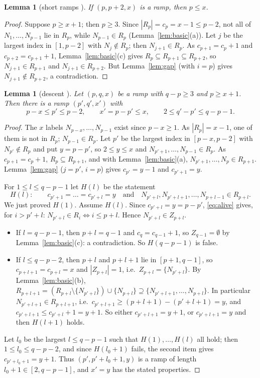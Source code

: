 \documentclass[11pt]{article}
\newtheorem{lemma}[theorem]{Lemma}
\theoremstyle{definition}
\newcommand{\R}{R}
\renewcommand{\le}{\leqslant}
\renewcommand{\ge}{\geqslant}
\begin{document}
\begin{lemma}[short ramps {\cite[Lemma~3.6]{GH}}]\label{lem:short}
If $(p,p+2,x)$ is a ramp, then $p\le x$.
\end{lemma}
\begin{proof}
Suppose $p\ge x+1$; then $p\ge3$.  Since $|\R_p|=c_p=x-1\le p-2$, not all of $N_1,\dots,N_{p-1}$ lie in
$\R_p$, while $N_{p-1}\in \R_p$ (Lemma~\ref{lem:basic}(a)).  Let $j$ be the largest index in $[1,p-2]$ with
$N_j\notin \R_p$; then $N_{j+1}\in \R_p$.  As $c_{p+1}=c_p+1$ and $c_{p+2}=c_{p+1}+1$, Lemma~\ref{lem:basic}(c)
gives $\R_p\subseteq \R_{p+1}\subseteq \R_{p+2}$, so $N_{j+1}\in \R_{p+1}$ and $N_{j+1}\in \R_{p+2}$.  But
Lemma~\ref{lem:gap} (with $i=p$) gives $N_{j+1}\notin \R_{p+2}$, a contradiction.
\end{proof}

\begin{lemma}[descent {\cite[Lemma~3.5]{GH}}]\label{lem:descent}
Let $(p,q,x)$ be a ramp with $q-p\ge3$ and $p\ge x+1$.  Then there is a ramp $(p',q',x')$ with
\[p-x\le p'\le p-2,\qquad x'=p-p'\le x,\qquad 2\le q'-p'\le q-p-1 .\]
\end{lemma}
\begin{proof}
The $x$ labels $N_{p-x},\dots,N_{p-1}$ exist since $p-x\ge1$.  As $|\R_p|=x-1$, one of them is not in $\R_p$;
$N_{p-1}\in \R_p$.  Let $p'$ be the largest index in $[p-x,p-2]$ with $N_{p'}\notin \R_p$ and put $y=p-p'$, so
$2\le y\le x$ and $N_{p'+1},\dots,N_{p-1}\in \R_p$.  As $c_{p+1}=c_p+1$, $\R_p\subseteq \R_{p+1}$, and with
Lemma~\ref{lem:basic}(a), $N_{p'+1},\dots,N_p\in \R_{p+1}$.  Lemma~\ref{lem:gap} ($j=p'$, $i=p$) gives
$c_{p'}=y-1$ and $c_{p'+1}=y$.

For $1\le l\le q-p-1$ let $H(l)$ be the statement
\[H(l):\qquad c_{p'+1}=\dots=c_{p'+l}=y\quad\text{and}\quad N_{p'+l},N_{p'+l+1},\dots,N_{p+l-1}\in \R_{p+l}.\]
We just proved $H(1)$.  Assume $H(l)$.  Since
$c_{p'+l}=y=p-p'$, \eqref{eq:alive} gives, for $i>p'+l$: $N_{p'+l}\in \R_i\iff i\le p+l$.  Hence
$N_{p'+l}\in Z_{p+l}$.
\begin{itemize}
\item If $l=q-p-1$, then $p+l=q-1$ and $c_q=c_{q-1}+1$, so $Z_{q-1}=\emptyset$ by Lemma~\ref{lem:basic}(c): a
contradiction.  So $H(q-p-1)$ is false.
\item If $l\le q-p-2$, then $p+l$ and $p+l+1$ lie in $[p+1,q-1]$, so $c_{p+l+1}=c_{p+l}=x$ and $|Z_{p+l}|=1$,
i.e.\ $Z_{p+l}=\{N_{p'+l}\}$.  By Lemma~\ref{lem:basic}(b),
$\R_{p+l+1}=(\R_{p+l}\setminus\{N_{p'+l}\})\cup\{N_{p+l}\}\supseteq\{N_{p'+l+1},\dots,N_{p+l}\}$.  In particular
$N_{p'+l+1}\in \R_{p+l+1}$, i.e.\ $c_{p'+l+1}\ge(p+l+1)-(p'+l+1)=y$, and $c_{p'+l+1}\le c_{p'+l}+1=y+1$.  So either
$c_{p'+l+1}=y+1$, or $c_{p'+l+1}=y$ and then $H(l+1)$ holds.
\end{itemize}
Let $l_0$ be the largest $l\le q-p-1$ such that $H(1),\dots,H(l)$ all hold; then $1\le l_0\le q-p-2$, and
since $H(l_0+1)$ fails, the second item gives $c_{p'+l_0+1}=y+1$.  Thus $(p',p'+l_0+1,y)$ is a ramp of
length $l_0+1\in[2,q-p-1]$, and $x'=y$ has the stated properties.
\end{proof}
\end{document}
